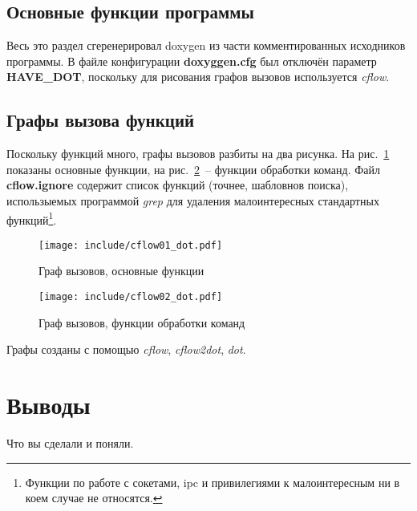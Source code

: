 \documentclass[a4paper,12pt]{report}
\begin{document}
\section{Основные функции программы}

Весь это раздел сгеренерировал doxygen из части комментированных исходников программы. В файле конфигурации \textbf{doxyggen.cfg} был отключён параметр \textbf{HAVE\_DOT}, поскольку для рисования графов вызовов используется \textit{cflow}.

%








\section{Графы вызова функций}

Поскольку функций много, графы вызовов разбиты на два рисунка. На рис.~\ref{fig:cflow01} показаны основные функции, на рис.~\ref{fig:cflow02}~-- функции обработки команд. Файл \textbf{cflow.ignore} содержит список функций (точнее, шабловнов поиска), использыемых программой \textit{grep} для удаления малоинтересных стандартных функций\footnote{Функции по работе с сокетами, ipc и привилегиями к малоинтересным ни в коем случае не относятся.}.

\begin{figure}
\centering
\texttt{[image: include/cflow01\_dot.pdf]}
\caption{Граф вызовов, основные функции}
\label{fig:cflow01}
\end{figure}

\begin{figure}
\centering
\texttt{[image: include/cflow02\_dot.pdf]}
\caption{Граф вызовов, функции обработки команд}
\label{fig:cflow02}
\end{figure}

Графы созданы с помощью \textit{cflow}, \textit{cflow2dot}, \textit{dot}.

\chapter*{Выводы}

Что вы сделали и поняли.
\end{document}
